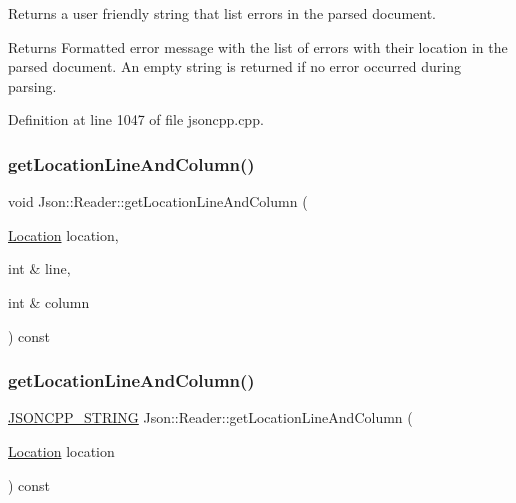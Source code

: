 Returns a user friendly string that list errors in the parsed document. 

\begin{DoxyReturn}{Returns}
Formatted error message with the list of errors with their location in the parsed document. An empty string is returned if no error occurred during parsing. 
\end{DoxyReturn}


Definition at line 1047 of file jsoncpp.\+cpp.

\hypertarget{class_json_1_1_reader_a8b2fb6af24382c3914fd4643b092c675}{}\label{class_json_1_1_reader_a8b2fb6af24382c3914fd4643b092c675} 
\subsubsection{\texorpdfstring{get\+Location\+Line\+And\+Column()}{getLocationLineAndColumn()}\hspace{0.1cm}{\footnotesize\ttfamily [1/4]}}
{\footnotesize\ttfamily void Json\+::\+Reader\+::get\+Location\+Line\+And\+Column (\begin{DoxyParamCaption}\item[{\hyperlink{class_json_1_1_reader_a46795b5b272bf79a7730e406cb96375a}{Location}}]{location,  }\item[{int \&}]{line,  }\item[{int \&}]{column }\end{DoxyParamCaption}) const\hspace{0.3cm}{\ttfamily [private]}}

\hypertarget{class_json_1_1_reader_a49757dec5a1a53eff388dc7bf2bda890}{}\label{class_json_1_1_reader_a49757dec5a1a53eff388dc7bf2bda890} 
\subsubsection{\texorpdfstring{get\+Location\+Line\+And\+Column()}{getLocationLineAndColumn()}\hspace{0.1cm}{\footnotesize\ttfamily [2/4]}}
{\footnotesize\ttfamily \hyperlink{config_8h_a1e723f95759de062585bc4a8fd3fa4be}{J\+S\+O\+N\+C\+P\+P\+\_\+\+S\+T\+R\+I\+NG} Json\+::\+Reader\+::get\+Location\+Line\+And\+Column (\begin{DoxyParamCaption}\item[{\hyperlink{class_json_1_1_reader_a46795b5b272bf79a7730e406cb96375a}{Location}}]{location }\end{DoxyParamCaption}) const\hspace{0.3cm}{\ttfamily [private]}}

